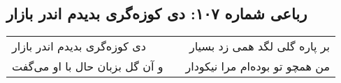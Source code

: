 \begin{center}
\section*{رباعی شماره ۱۰۷: دی کوزه‌گری بدیدم اندر بازار}
\label{sec:sh107}
\begin{longtable}{l p{0.5cm} r}
دی کوزه‌گری بدیدم اندر بازار
&&
بر پاره گلی لگد همی زد بسیار
\\
و آن گل بزبان حال با او می‌گفت
&&
من همچو تو بوده‌ام مرا نیکودار
\\
\end{longtable}
\end{center}
